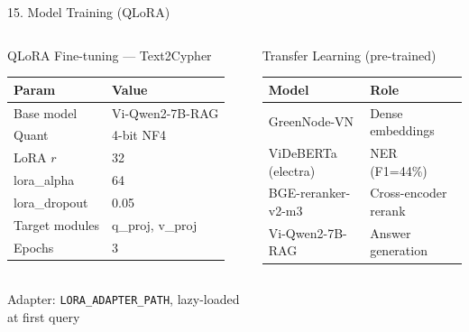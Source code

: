 \documentclass[aspectratio=169]{beamer}
\begin{document}
\iffalse
\begin{frame}[shrink=15]{15. Model Training (QLoRA)}
\begin{columns}[T]
\begin{block}{QLoRA Fine-tuning --- Text2Cypher}
{\scriptsize
\begin{tabular}{@{}ll@{}}
\toprule
\textbf{Param} & \textbf{Value} \\
\midrule
Base model      & Vi-Qwen2-7B-RAG \\
Quant           & 4-bit NF4 \\
LoRA $r$        & 32 \\
lora\_alpha     & 64 \\
lora\_dropout   & 0.05 \\
Target modules  & q\_proj, v\_proj \\
Epochs          & 3 \\
\bottomrule
\end{tabular}
}
\smallskip\\
{\scriptsize Adapter: \texttt{LORA\_ADAPTER\_PATH}, lazy-loaded at first query}
\end{block}

\begin{block}{Transfer Learning (pre-trained)}
{\scriptsize
\begin{tabular}{@{}p{2.8cm}p{2.8cm}@{}}
\toprule
\textbf{Model} & \textbf{Role} \\
\midrule
GreenNode-VN        & Dense embeddings \\
ViDeBERTa (electra) & NER (F1=44\%) \\
BGE-reranker-v2-m3  & Cross-encoder rerank \\
Vi-Qwen2-7B-RAG     & Answer generation \\
\bottomrule
\end{tabular}
}
\end{block}
\end{columns}
\end{frame}
\end{document}
